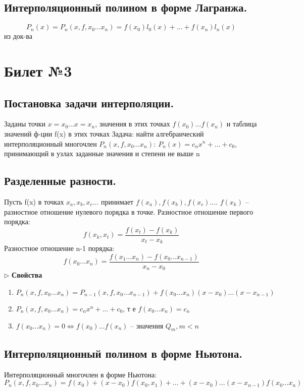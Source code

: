 \documentclass[a4paper]{article}
\begin{document}
\subsection{Интерполяционный полином в форме Лагранжа.}
	$$P_n(x) = P_n(x,f,x_0 \ldots x_n) = f(x_0)l_0(x) + \ldots + f(x_n)l_n(x)$$ из док-ва

\section{Билет №3}
\subsection{Постановка задачи интерполяции.}
Заданы точки $x=x_0 \ldots x=x_n$, значения в этих точках $f(x_0) \ldots f(x_n)$ и таблица значений ф-ции f(x) в этих точках
Задача: найти алгебраический интерполяционный многочлен $P_n(x,f,x_0 \ldots x_n): \ P_n(x) = c_nx^n + \ldots +c_0$, принимающий в узлах заданные значения и степени не выше n
\subsection{Разделенные разности.}
Пусть f(x) в точках $x_a, x_b, x_c \ldots$ принимает $f(x_a), f(x_b), f(x_c) \ldots$. $f(x_k)$ – разностное отношение нулевого порядка в точке. Разностное отношение первого порядка: $$ f(x_k,x_t) = \frac{f(x_t) - f(x_k)}{x_t - x_k}$$
Разностное отношение n-1 порядка: $$ f(x_0 \ldots x_n) = \frac{f(x_1 \ldots x_n) - f(x_0 \ldots x_{n-1})}{x_n - x_0}$$
$\triangleright$ \textbf{Свойства}
\begin{enumerate}
	\item $P_n(x,f,x_0 \ldots x_n) = P_{n-1}(x,f,x_0 \ldots x_{n-1}) + f(x_0 \ldots x_n)(x-x_0)\ldots (x-x_{n-1})$
	\item $P_n(x,f,x_0 \ldots x_n) = c_nx^n + \ldots + c_0$, т е $f(x_0 \ldots x_n) = c_n$
	\item $f(x_0 \ldots x_n)=0 \iff f(x_0) \ldots f(x_n)$ – значения $Q_m, m<n$
\end{enumerate}
\subsection{Интерполяционный полином в форме Ньютона.}
Интерполяционный многочлен в форме Ньютона: $$P_n(x, f, x_0 \ldots x_n) = f(x_0) + (x-x_0)f(x_0,x_1) + \ldots + (x-x_0)\ldots (x-x_{n-1})f(x_0 \ldots x_n) $$
\end{document}
